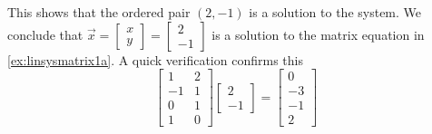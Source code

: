 \documentclass{ximera}
\begin{document}
\begin{example}
\begin{explanation}
 This shows that the ordered pair $(2, -1)$ is a solution to the system.  We conclude that $\vec{x}=\begin{bmatrix}x\\y\end{bmatrix}=\begin{bmatrix}2\\-1\end{bmatrix}$ is a solution to the matrix equation in \ref{ex:linsysmatrix1a}.  A quick verification confirms this
 $$\begin{bmatrix}1&2\\-1&1\\0&1\\1&0\end{bmatrix}\begin{bmatrix}2\\-1\end{bmatrix}=\begin{bmatrix}0\\-3\\-1\\2\end{bmatrix}$$
    \end{explanation}
\end{example}
\end{document}
